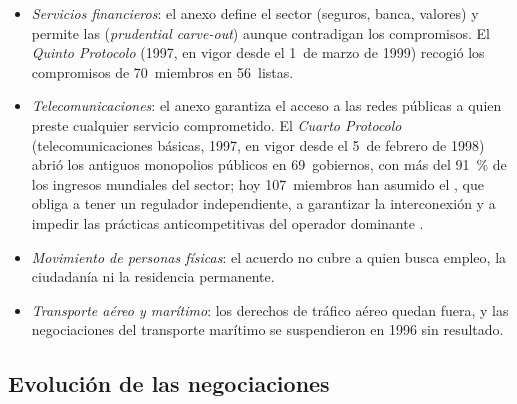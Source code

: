 \documentclass[11pt]{article}
\begin{document}
\begin{itemize}
\item \emph{Servicios financieros}: el anexo define el sector (seguros, banca, valores) y permite las  (\emph{prudential carve-out}) aunque contradigan los compromisos. El \emph{Quinto Protocolo} (1997, en vigor desde el 1~de marzo de 1999) recogió los compromisos de 70~miembros en 56~listas.
\item \emph{Telecomunicaciones}: el anexo garantiza el acceso a las redes públicas a quien preste cualquier servicio comprometido. El \emph{Cuarto Protocolo} (telecomunicaciones básicas, 1997, en vigor desde el 5~de febrero de 1998) abrió los antiguos monopolios públicos en 69~gobiernos, con más del 91~\% de los ingresos mundiales del sector; hoy 107~miembros han asumido el , que obliga a tener un regulador independiente, a garantizar la interconexión y a impedir las prácticas anticompetitivas del operador dominante .
\item \emph{Movimiento de personas físicas}: el acuerdo no cubre a quien busca empleo, la ciudadanía ni la residencia permanente.
\item \emph{Transporte aéreo y marítimo}: los derechos de tráfico aéreo quedan fuera, y las negociaciones del transporte marítimo se suspendieron en 1996 sin resultado.
\end{itemize}

\subsection{Evolución de las negociaciones}\label{sec:agcs-negociaciones}
\end{document}
